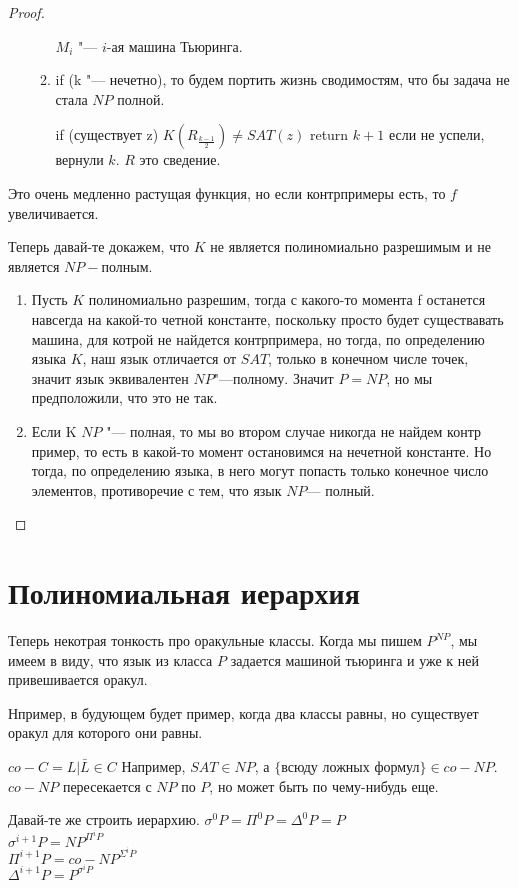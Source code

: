 \begin{proof}
\begin{enumerate}
\begin{enumerate}
    $M_i$ "--- $i$-ая машина Тьюринга. 
    \item if (k "--- нечетно), то будем портить  жизнь сводимостям, 
    что бы задача не стала $NP$ полной. 

    if (существует z) $K(R_{\frac{k - 1}{2}}) \ne SAT(z)$ return $k + 1$
    если не успели, вернули $k$. $R$ это сведение. 
    \end{enumerate} 
\end{enumerate}

Это очень медленно растущая функция, но если контрпримеры есть, 
то $f$ увеличивается.

Теперь давай-те докажем, что $K$  не является полиномиально разрешимым и 
не является $NP-$полным. 
\begin{enumerate}
\item Пусть $K$ полиномиально разрешим, тогда 
с какого-то момента f останется навсегда на какой-то 
четной константе, поскольку просто будет существавать 
машина, для котрой не найдется контрпримера, но тогда, 
по определению языка $K$, наш язык отличается от 
$SAT$, только в конечном числе точек, значит 
язык эквивалентен $NP$"---полному. Значит $P = NP$, 
но мы предположили, что это не так. 
\item 
Если K $NP$ "--- полная, то мы во втором 
случае никогда не найдем контр пример, то 
есть в какой-то момент остановимся на нечетной константе. 
Но тогда, по определению языка, в него могут попасть только конечное число 
элементов, противоречие с тем, что язык $NP$--- полный. 
\end{enumerate}
\end{proof}

\section{Полиномиальная иерархия}

Теперь некотрая тонкость про оракульные классы. Когда 
мы пишем $P^{NP}$, мы имеем в виду, что язык из класса 
$P$ задается машиной тьюринга и уже к ней привешивается оракул. 

Нпример, в будующем будет пример, когда два классы равны, но существует оракул
для которого они равны. 
 
$co-C = {L|\bar{L} \in C}$
Например, $SAT \in NP$, а $\{$всюду ложных формул$\} \in co-NP$.\\

$co-NP$ пересекается с $NP$ по $P$, но может быть по чему-нибудь еще. 

Давай-те же строить иерархию.
$\sigma^0P = \Pi^0P = \Delta^0P = P$\\
$\sigma^{i + 1}P = NP^{\Pi^iP}$\\
$\Pi^{i + 1}P = co-NP^{\Sigma^iP}$\\
$\Delta^{i + 1}P = P^{\sigma^iP}$

